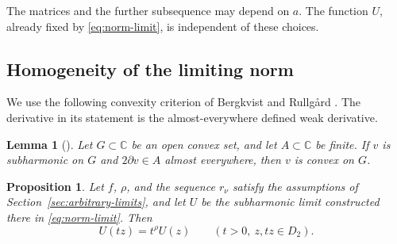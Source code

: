 \documentclass[11pt,letterpaper,reqno]{amsart}
\newtheorem{lem}[thm]{Lemma}
\newtheorem{prop}[thm]{Proposition}
\theoremstyle{remark}
\numberwithin{equation}{section}
\newcommand{\C}{\mathbb C}
\begin{document}
The matrices and the further subsequence may depend on $a$. The function
$U$, already fixed by \eqref{eq:norm-limit}, is independent of these choices.

\subsection{Homogeneity of the limiting norm}

We use the following convexity criterion of Bergkvist and Rullg{\aa}rd
\cite[Corollary~1]{BR02}. The derivative in its statement is the
almost-everywhere defined weak derivative.

\begin{lem}[{\cite[Corollary~1]{BR02}}]\label{lem:finite-gradient-convex}
Let $G\subset\C$ be an open convex set, and let $A\subset\C$ be finite.
If $v$ is subharmonic on $G$ and $2\partial v\in A$ almost everywhere,
then $v$ is convex on $G$.
\end{lem}

\begin{prop}\label{prop:homogeneity}
Let $f$, $\rho$, and the sequence $r_\nu$ satisfy the assumptions
of Section~\ref{sec:arbitrary-limits}, and let $U$ be the subharmonic
limit constructed there in \eqref{eq:norm-limit}. Then
\begin{equation}\label{eq:homogeneity}
 U(tz)=t^\rho U(z)\qquad(t>0,\ z,tz\in D_2).
\end{equation}
\end{prop}
\end{document}

